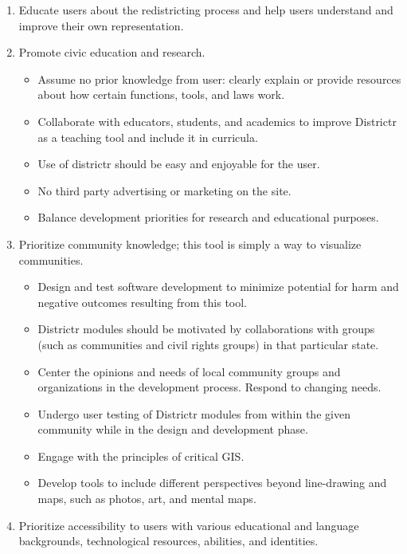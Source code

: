 \documentclass{mgggarticle}
\begin{document}
\newpage
{}

\begin{enumerate}
  \item Educate users about the redistricting process and help users understand and improve their own representation.
  \item Promote civic education and research.
  \begin{itemize}
      \item Assume no prior knowledge from user: clearly explain or provide resources about how certain functions, tools, and laws work. 
      \item Collaborate with educators, students, and academics to improve Districtr as a teaching tool and include it in curricula.
      \item Use of districtr should be easy and enjoyable for the user.
      \item No third party advertising or marketing on the site. 
      \item Balance development priorities for research and educational purposes.
  \end{itemize}
  \item Prioritize community knowledge; this tool is simply a way to visualize communities.
  \begin{itemize}
      \item Design and test software development to minimize potential for harm and negative outcomes resulting from this tool. 
      \item Districtr modules should be motivated by collaborations with groups (such as communities and civil rights groups) in that particular state. 
      \item Center the opinions and needs of local community groups and organizations in the development process. Respond to changing needs. 
      \item Undergo user testing of Districtr modules from within the given community while in the design and development phase.
      \item Engage with the principles of critical GIS.
      \item Develop tools to include different perspectives beyond line-drawing and maps, such as photos, art, and mental maps. 
  \end{itemize}
  \item Prioritize accessibility to users with various educational and language backgrounds, technological resources, abilities, and identities. 

\end{enumerate}
\end{document}
